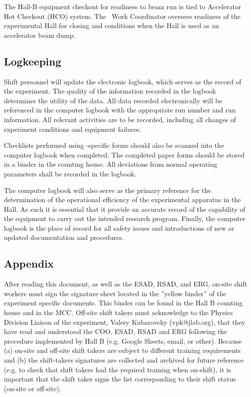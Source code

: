 \documentclass[11pt]{article}
\begin{document}
The Hall-B equipment checkout for readiness to beam run
is tied to Accelerator Hot Checkout (HCO) system. 
The \HALL\ Work Coordinator oversees readiness of the experimental Hall for closing and 
conditions when the Hall is used as an accelerator beam dump. 

\subsection{Logkeeping}
\indent

Shift personnel will update the electronic
logbook, which serves as the record of the experiment. 
The quality of the information recorded in the logbook 
determines the utility of the data.
All data recorded electronically
will be referenced in the  computer 
logbook with the appropriate run number and run information. All 
relevant activities are to be recorded, including 
all changes of experiment conditions and equipment failures.

Checklists performed using \HALL-specific forms should also be scanned 
into the computer logbook when completed. The completed paper forms should 
be stored in a binder in the counting house.  All deviations from normal 
operating parameters shall  be recorded in the logbook. 

The computer logbook will also serve as the primary reference for the
determination of the operational efficiency of the experimental apparatus in
the Hall. As such it is essential that it provide an accurate record of the 
capability of the equipment to carry out the intended research program. 
Finally, the computer logbook is the place of record for all safety issues and 
introductions of new or updated documentation and procedures.

\begin{appendices}
\section{Appendix}
\indent
After reading this document, as well as the ESAD, RSAD, and ERG, on-site shift workers must sign the signature sheet located in the ”yellow binder” of the experiment specific documents. This binder can be found in the Hall B counting house and in the MCC. Off-site shift takers must acknowledge to the Physics Division Liaison of the experiment, Valery Kubarovsky (vpk@jlab.org), that they have read and understood the COO, ESAD, RSAD and ERG following the procedure implemented by Hall B (e.g. Google Sheets, email, or other). Because (a) on-site and off-site shift takers are subject to different training requirements and (b) the shift-takers signatures are collected and archived for future reference (e.g. to check that shift takers had the required training when on-shift), it is important that the shift taker signs the list corresponding to their shift status (on-site or off-site).
\end{appendices}
\end{document}
